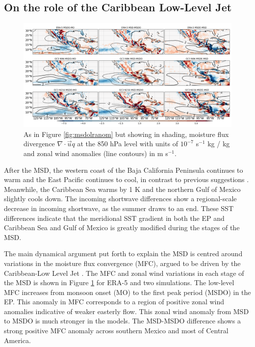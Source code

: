 \subsection{On the role of the Caribbean Low-Level Jet}

 \begin{figure}[t!]
\includegraphics[width=\linewidth]{figures/modcompar_dif2mfc3}
\caption{As in Figure \ref{fig:msdolranom} but showing in shading, moisture flux divergence $\nabla \cdot \vec{u}q$ at the 850 hPa level with units of $10^{-7}$ s$^{-1}$ kg / kg and zonal wind anomalies (line contours) in m s$^{-1}$.  }
\label{fig:msdmfcanom}
\end{figure}

After the MSD, the western coast of the Baja California Peninsula continues to warm and the East Pacific continues to cool, in contrast to previous suggestions \citep{magana1999,magana2005,herrera2015}. Meanwhile, the Caribbean Sea warms by 1 K and the northern Gulf of Mexico slightly cools down. The incoming shortwave differences show a regional-scale decrease in incoming shortwave, as the summer draws to an end. 
These SST differences indicate that the meridional SST gradient in both the EP and Caribbean Sea and Gulf of Mexico is greatly modified during the stages of the MSD. 


The main dynamical argument put forth to explain the MSD is centred around variations in the moisture flux convergence (MFC), argued to be driven by the Caribbean-Low Level Jet \citep[see e.g.][]{gamble2008,herrera2015,martinez2019}. The MFC and zonal wind variations in each stage of the MSD is shown in Figure \ref{fig:msdmfcanom} for ERA-5 and two simulations. The low-level MFC increases from monsoon onset (MO) to the first peak period (MSDO) in the EP. This anomaly in MFC corresponds to a region of positive zonal wind anomalies indicative of weaker easterly flow.
 This zonal wind anomaly from MSD to MSDO is much stronger in the models.  
The MSD-MSDO difference shows a strong positive MFC anomaly across southern Mexico and most of Central America. 

